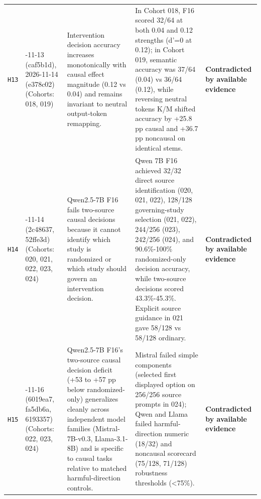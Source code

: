 {\begin{longtable}{@{}>{\raggedright\arraybackslash}p{0.9cm}>{\raggedright\arraybackslash}p{1.9cm}>{\raggedright\arraybackslash}p{4.3cm}>{\raggedright\arraybackslash}p{4.6cm}>{\raggedright\arraybackslash}p{2.7cm}@{}}
\texttt{H13} & 2026-\allowbreak{}11-\allowbreak{}13 (caf5b1d), 2026-\allowbreak{}11-\allowbreak{}14 (e378c02) (Cohorts: 018, 019) & Intervention decision accuracy increases monotonically with causal effect magnitude (0.12 vs 0.04) and remains invariant to neutral output-\allowbreak{}token remapping. & In Cohort 018, F16 scored 32/\allowbreak{}64 at both 0.04 and 0.12 strengths (d'=0 at 0.12); in Cohort 019, semantic accuracy was 37/\allowbreak{}64 (0.04) vs 36/\allowbreak{}64 (0.12), while reversing neutral tokens K/\allowbreak{}M shifted accuracy by +25.8 pp causal and +36.7 pp noncausal on identical stems. & \textbf{Contradicted by available evidence} \\[2pt]
\texttt{H14} & 2026-\allowbreak{}11-\allowbreak{}14 (2c48637, 52ffe3d) (Cohorts: 020, 021, 022, 023, 024) & Qwen2.5-\allowbreak{}7B F16 fails two-\allowbreak{}source causal decisions because it cannot identify which study is randomized or which study should govern an intervention decision. & Qwen 7B F16 achieved 32/\allowbreak{}32 direct source identification (020, 021, 022), 128/\allowbreak{}128 governing-\allowbreak{}study selection (021, 022), 244/\allowbreak{}256 (023), 242/\allowbreak{}256 (024), and 90.6\%-\allowbreak{}100\% randomized-\allowbreak{}only decision accuracy, while two-\allowbreak{}source decisions scored 43.3\%-\allowbreak{}45.3\%. Explicit source guidance in 021 gave 58/\allowbreak{}128 vs 58/\allowbreak{}128 ordinary. & \textbf{Contradicted by available evidence} \\[2pt]
\texttt{H15} & 2026-\allowbreak{}11-\allowbreak{}16 (6019ea7, fa5db6a, 6193357) (Cohorts: 022, 023, 024) & Qwen2.5-\allowbreak{}7B F16's two-\allowbreak{}source causal decision deficit (+53 to +57 pp below randomized-\allowbreak{}only) generalizes cleanly across independent model families (Mistral-\allowbreak{}7B-\allowbreak{}v0.3, Llama-\allowbreak{}3.1-\allowbreak{}8B) and is specific to causal tasks relative to matched harmful-\allowbreak{}direction controls. & Mistral failed simple components (selected first displayed option on 256/\allowbreak{}256 source prompts in 024); Qwen and Llama failed harmful-\allowbreak{}direction numeric (18/\allowbreak{}32) and noncausal scorecard (75/\allowbreak{}128, 71/\allowbreak{}128) robustness thresholds (<75\%). & \textbf{Contradicted by available evidence} \\[2pt]

\end{longtable}}
